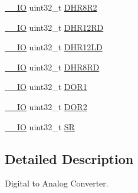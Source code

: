 \begin{DoxyCompactItemize}
\hyperlink{group___c_m_s_i_s__core__definitions_gaec43007d9998a0a0e01faede4133d6be}{\-\_\-\-\_\-\-I\-O} uint32\-\_\-t \hyperlink{struct_d_a_c___type_def_a3b096b71656f8fb32cd18b4c8b1d2334}{D\-H\-R8\-R2}
\item 
\hyperlink{group___c_m_s_i_s__core__definitions_gaec43007d9998a0a0e01faede4133d6be}{\-\_\-\-\_\-\-I\-O} uint32\-\_\-t \hyperlink{struct_d_a_c___type_def_affa5cc9fe0cc9eb594d703bdc9d9abd9}{D\-H\-R12\-R\-D}
\item 
\hyperlink{group___c_m_s_i_s__core__definitions_gaec43007d9998a0a0e01faede4133d6be}{\-\_\-\-\_\-\-I\-O} uint32\-\_\-t \hyperlink{struct_d_a_c___type_def_aea4d055e3697999b44cdcf2702d79d40}{D\-H\-R12\-L\-D}
\item 
\hyperlink{group___c_m_s_i_s__core__definitions_gaec43007d9998a0a0e01faede4133d6be}{\-\_\-\-\_\-\-I\-O} uint32\-\_\-t \hyperlink{struct_d_a_c___type_def_a03f8d95bbf0ce3a53cb79506d5bf995a}{D\-H\-R8\-R\-D}
\item 
\hyperlink{group___c_m_s_i_s__core__definitions_gaec43007d9998a0a0e01faede4133d6be}{\-\_\-\-\_\-\-I\-O} uint32\-\_\-t \hyperlink{struct_d_a_c___type_def_a50b4f0b0d2a376f729c8d7acf47864c3}{D\-O\-R1}
\item 
\hyperlink{group___c_m_s_i_s__core__definitions_gaec43007d9998a0a0e01faede4133d6be}{\-\_\-\-\_\-\-I\-O} uint32\-\_\-t \hyperlink{struct_d_a_c___type_def_a1bde8391647d6422b39ab5ba4f13848b}{D\-O\-R2}
\item 
\hyperlink{group___c_m_s_i_s__core__definitions_gaec43007d9998a0a0e01faede4133d6be}{\-\_\-\-\_\-\-I\-O} uint32\-\_\-t \hyperlink{struct_d_a_c___type_def_a1d3fd83d6ed8b2d90b471db4509b0e70}{S\-R}
\end{DoxyCompactItemize}


\subsection{Detailed Description}
Digital to Analog Converter. 

